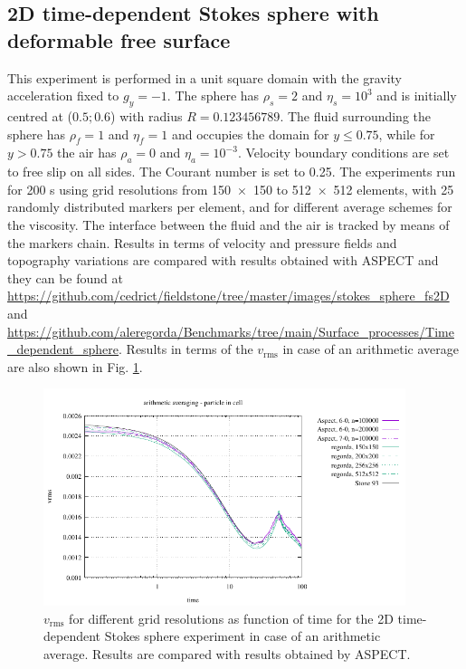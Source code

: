 \documentclass[hidelinks,10pt,a4paper]{article}
\begin{document}
\subsection{2D time-dependent Stokes sphere with deformable free surface}\label{sec:sphere}
This experiment is performed in a unit square domain with the gravity acceleration fixed to $g_y=-1$. The sphere has $\rho_s=2$ and $\eta_s=10^3$ and is
initially centred at ($0.5;0.6$) with radius $R=0.123456789$. The fluid surrounding the sphere has $\rho_f=1$ and $\eta_f=1$ and occupies the domain for
$y\leq 0.75$, while for $y>0.75$ the air has $\rho_a=0$ and $\eta_a=10^{-3}$. Velocity boundary conditions are set to free slip on all sides. The Courant
number is set to 0.25. The experiments run for 200 s using grid resolutions from \num{150x150} to \num{512x512} elements, with 25 randomly distributed markers
per element, and for different average schemes for the viscosity. The interface between the fluid and the air is tracked by means of the markers chain. Results
in terms of velocity and pressure fields and topography variations are compared with results obtained with ASPECT
\citep{KHB12,heister_aspect_methods2,aspect-doi-v2.2.0,aspectmanual} and they can be found at
\url{https://github.com/cedrict/fieldstone/tree/master/images/stokes_sphere_fs2D} and
\url{https://github.com/aleregorda/Benchmarks/tree/main/Surface_processes/Time_dependent_sphere}. Results in terms of the $v_{\textrm{rms}}$ in case of 
an arithmetic average are also shown in Fig. \ref{fig:inst_spherefs}.

\begin{figure}
\centering
\noindent\includegraphics[width=400px]{./Figures/vrms_arithm.pdf}
\caption{$v_{\textrm{rms}}$ for different grid resolutions as function of time for the 2D time-dependent Stokes sphere experiment in case of an arithmetic average.
Results are compared with results obtained by ASPECT.}
\label{fig:inst_spherefs}
\end{figure}
\end{document}
